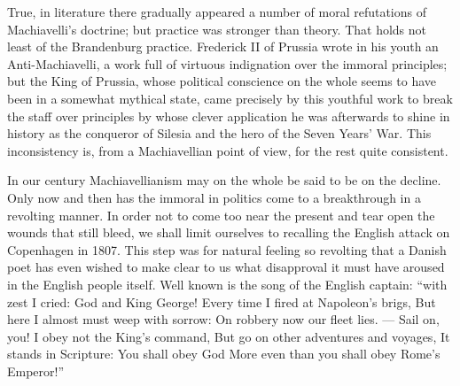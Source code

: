 \documentclass[12pt,a4paper,openany]{book}
\newcommand{\opage}[1]{\marginnote{\footnotesize\textit{[#1]}}}
\begin{document}
\setcounter{footnote}{0}%
\opage{97}True, in literature there gradually appeared a
number of moral refutations of Machiavelli's doctrine; but
practice was stronger than theory. That holds not
least of the Brandenburg practice. Frederick II of
Prussia wrote in his youth an Anti-Machiavelli, a
work full of virtuous indignation over the immoral principles;
but the King of Prussia, whose political conscience
on the whole seems to have been in a
somewhat mythical state, came precisely by this youthful work
to break the staff over principles by whose
clever application he was afterwards to shine in history as the conqueror of Silesia
and the hero of the Seven Years' War. This
inconsistency is, from a Machiavellian point of view,
for the rest quite consistent.

In our century Machiavellianism may on the whole
be said to be on the decline. Only now and
then has the immoral in politics come to a breakthrough
in a revolting manner. In order not to come too near
the present and tear open the wounds that still bleed,
we shall limit ourselves to recalling the English
attack on Copenhagen in 1807. This step was for
natural feeling so revolting that a Danish poet
has even wished to make clear to us what disapproval
it must have aroused in the English people itself.
Well known is the song of the English captain: ``with
zest I cried: God and King George! Every time I
fired at Napoleon's brigs, But here I almost
must weep with sorrow: On robbery now our fleet lies.
--- Sail on, you! I obey not the King's command, But go
on other adventures and voyages, It stands in Scripture:
You shall obey God More even than you shall obey Rome's
Emperor!''
\end{document}
